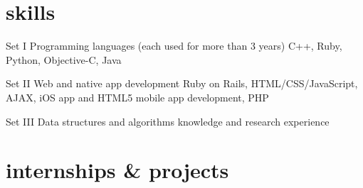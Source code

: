 \documentclass[print]{friggeri-cv} %
\begin{document}

\section{skills}

\begin{entrylist}
  \entry
  {Set I}
  {Programming languages (each used for more than 3 years)}
  {}
  {C++, Ruby, Python, Objective-C, Java}

  \entry
  {Set II}
  {Web and native app development}
  {}
  {Ruby on Rails, HTML/CSS/JavaScript, AJAX, iOS app and HTML5 mobile app development, PHP}

  \sentry
  {Set III}
  {Data structures and algorithms knowledge and research experience}
  {}
\end{entrylist}


\section{internships \& projects}
\end{document}
